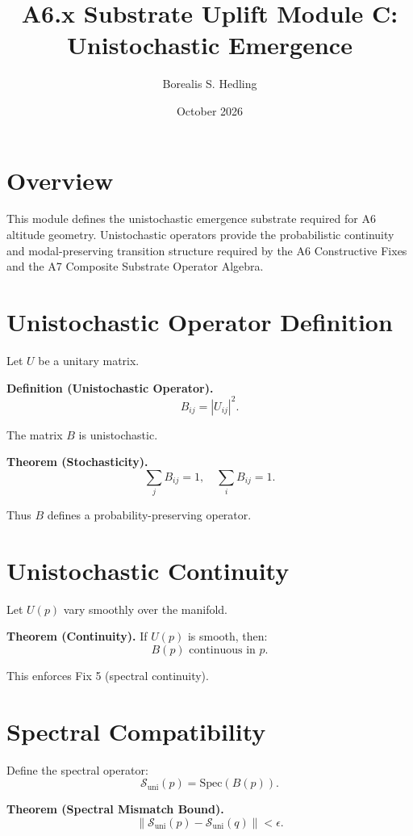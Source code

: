 \documentclass[11pt]{article}
\title{A6.x Substrate Uplift Module C: Unistochastic Emergence}
\author{Borealis S. Hedling}
\date{October 2026}
\begin{document}
\maketitle

\section*{Overview}

This module defines the unistochastic emergence substrate required for A6
altitude geometry. Unistochastic operators provide the probabilistic continuity
and modal-preserving transition structure required by the A6 Constructive Fixes
and the A7 Composite Substrate Operator Algebra.

\section{Unistochastic Operator Definition}

Let $U$ be a unitary matrix.

\textbf{Definition (Unistochastic Operator).}
\[
B_{ij} = |U_{ij}|^2.
\]

The matrix $B$ is unistochastic.

\textbf{Theorem (Stochasticity).}
\[
\sum_j B_{ij} = 1, \quad \sum_i B_{ij} = 1.
\]

Thus $B$ defines a probability-preserving operator.

\section{Unistochastic Continuity}

Let $U(p)$ vary smoothly over the manifold.

\textbf{Theorem (Continuity).}
If $U(p)$ is smooth, then:
\[
B(p) \text{ continuous in } p.
\]

This enforces Fix 5 (spectral continuity).

\section{Spectral Compatibility}

Define the spectral operator:
\[
\mathcal{S}_{\mathrm{uni}}(p) = \mathrm{Spec}(B(p)).
\]

\textbf{Theorem (Spectral Mismatch Bound).}
\[
\|\mathcal{S}_{\mathrm{uni}}(p) - \mathcal{S}_{\mathrm{uni}}(q)\| < \epsilon.
\]
\end{document}
